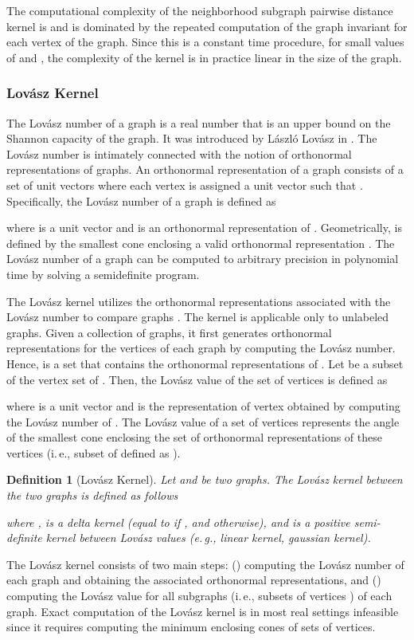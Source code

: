 \documentclass[twoside,11pt]{article}
\newcommand{\eg}{e.\,g., }
\newcommand{\ie}{i.\,e., }
\newtheorem{definition}{Definition}
\begin{document}
The computational complexity of the neighborhood subgraph pairwise distance kernel is  and is dominated by the repeated computation of the graph invariant for each vertex of the graph.
Since this is a constant time procedure, for small values of  and , the complexity of the kernel is in practice linear in the size of the graph.

\subsubsection{Lov\'asz  Kernel}
The Lov\'asz number  of a graph  is a real number that is an upper bound on the Shannon capacity of the graph.
It was introduced by L\'aszl\'o Lov\'asz in  .
The Lov\'asz number is intimately connected with the notion of orthonormal representations of graphs.
An orthonormal representation of a graph  consists of a set of unit vectors  where each vertex  is assigned a unit vector  such that .
Specifically, the Lov\'asz number of a graph  is defined as

where  is a unit vector and  is an orthonormal representation of . 
Geometrically,  is defined by the smallest cone enclosing a valid orthonormal representation .
The Lov\'asz number  of a graph  can be computed to arbitrary precision in polynomial time by solving a semidefinite program.

The Lov\'asz  kernel utilizes the orthonormal representations associated with the Lov\'asz number to compare graphs .
The kernel is applicable only to unlabeled graphs.
Given a collection of graphs, it first generates orthonormal representations for the vertices of each graph by computing the Lov\'asz  number.
Hence,  is a set that contains the orthonormal representations of .
Let  be a subset of the vertex set of .
Then, the Lov\'asz value of the set of vertices  is defined as

where  is a unit vector and  is the representation of vertex  obtained by computing the Lov\'asz number  of .
The Lov\'asz value of a set of vertices  represents the angle of the smallest cone enclosing the set of orthonormal representations of these vertices (\ie subset of  defined as ).

\begin{definition}[Lov\'asz  Kernel]
	Let  and  be two graphs.
	The Lov\'asz  kernel between the two graphs is defined as follows
	
	where ,  is a delta kernel (equal to  if , and  otherwise), and  is a positive semi-definite kernel between Lov\'asz values (\eg linear kernel, gaussian kernel).
\end{definition}
The Lov\'asz  kernel consists of two main steps: () computing the Lov\'asz number  of each graph and obtaining the associated orthonormal representations, and () computing the Lov\'asz value for all subgraphs (\ie subsets of vertices ) of each graph.
Exact computation of the Lov\'asz  kernel is in most real settings infeasible since it requires computing the minimum enclosing cones of  sets of vertices.
\end{document}
